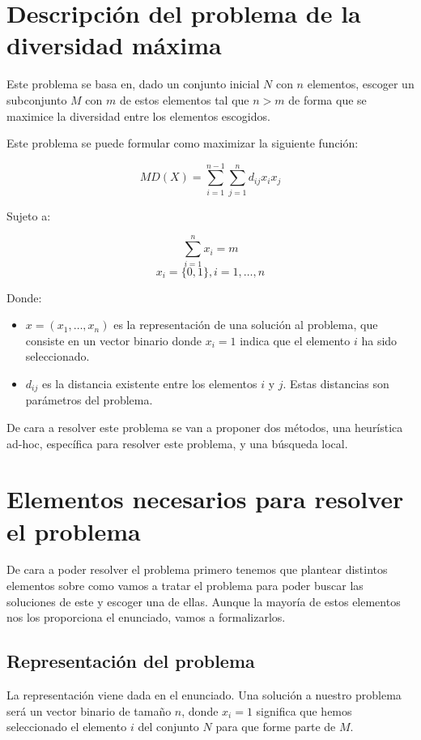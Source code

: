 \section{Descripción del problema de la diversidad máxima}

Este problema se basa en, dado un conjunto inicial $N$ con $n$ elementos, escoger un subconjunto $M$ con $m$ de estos elementos tal que $n > m$ de forma que se maximice la diversidad entre los elementos escogidos.

Este problema se puede formular como maximizar la siguiente función:

\[
MD(X) = \displaystyle\sum_{i=1}^{n - 1} \displaystyle\sum_{j=1}^{n} d_{ij} x_i x_j
\]

Sujeto a:

\[
\displaystyle\sum_{i=1}^{n} x_i = m
\]
\[
x_i = \{0,1\}, i = 1, \dots, n
\]

Donde:

\begin{itemize}
	\item $x = (x_1, \dots, x_n)$ es la representación de una solución al problema, que consiste en un vector binario donde $x_i = 1$ indica que el elemento $i$ ha sido seleccionado.
	\item $d_{ij}$ es la distancia existente entre los elementos $i$ y $j$. Estas distancias son parámetros del problema.
\end{itemize}

De cara a resolver este problema se van a proponer dos métodos, una heurística ad-hoc, específica para resolver este problema, y una búsqueda local.

\newpage

\section{Elementos necesarios para resolver el problema}

De cara a poder resolver el problema primero tenemos que plantear distintos elementos sobre como vamos a tratar el problema para poder buscar las soluciones de este y escoger una de ellas. Aunque la mayoría de estos elementos nos los proporciona el enunciado, vamos a formalizarlos.

\subsection{Representación del problema}

La representación viene dada en el enunciado. Una solución a nuestro problema será un vector binario de tamaño $n$, donde $x_i = 1$ significa que hemos seleccionado el elemento $i$ del conjunto $N$ para que forme parte de $M$.

